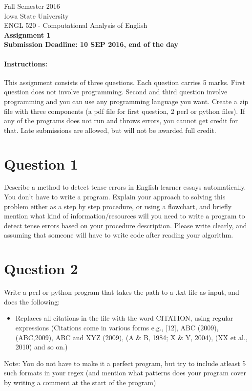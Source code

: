\documentclass[11pt,a4paper]{article}
\begin{document}
\begin{center}
  Fall Semester 2016 \\ Iowa State University\\[3ex]
  {\large ENGL 520 - Computational Analysis of English}\\[3ex]
  \textbf{Assignment 1} \\ \textbf{Submission Deadline: 10 SEP 2016, end of the day}
\end{center}


\paragraph{Instructions:} This assignment consists of three questions. Each question carries 5 marks. First question does not involve programming. Second and third question involve programming and you can use any programming language you want. Create a zip file with three components (a pdf file for first question, 2 perl or python files). If any of the programs does not run and throws errors, you cannot get credit for that. Late submissions are allowed, but will not be awarded full credit.

\section*{Question 1} 
Describe a method to detect tense errors in English learner essays automatically. You don't have to write a program. Explain your approach to solving this problem either as a step by step procedure, or using a flowchart, and briefly mention what kind of information/resources will you need to write a program to detect tense errors based on your procedure description. Please write clearly, and assuming that someone will have to write code after reading your algorithm.

\section*{Question 2}
Write a perl or python program that takes the path to a .txt file as input, and does the following:
\begin{itemize}
\item Replaces all citations in the file with the word CITATION, using regular expressions (Citations come in various forms e.g., [12], ABC (2009), (ABC,2009), ABC and XYZ (2009), (A \& B, 1984; X \& Y, 2004), (XX et al., 2010) and so on.) 
\end{itemize}
Note: You do not have to make it a perfect program, but try to include atleast 5 such formats in your regex (and mention what patterns does your program cover by writing a comment at the start of the program)
\end{document}
